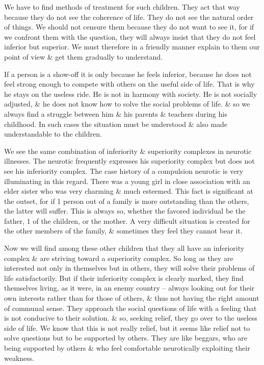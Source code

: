 \documentclass{article}
\begin{document}
We have to find methods of treatment for such children. They act that way because they do not see the coherence of life. They do not see the natural order of things. We should not censure them because they do not want to see it, for if we confront them with the question, they will always insist that they do not feel inferior but superior. We must therefore in a friendly manner explain to them our point of view \& get them gradually to understand.

If a person is a show-off it is only because he feels inferior, because he does not feel strong enough to compete with others on the useful side of life. That is why he stays on the useless ride. He is not in harmony with society. He is not socially adjusted, \& he does not know how to solve the social problems of life. \& so we always find a struggle between him \& his parents \& teachers during his childhood. In such cases the situation must be understood \& also made understandable to the children.

We see the same combination of inferiority \& superiority complexes in neurotic illnesses. The neurotic frequently expresses his superiority complex but does not see his inferiority complex. The case history of a compulsion neurotic is very illuminating in this regard. There was a young girl in close association with an elder sister who was very charming \& much esteemed. This fact is significant at the outset, for if 1 person out of a family is more outstanding than the others, the latter will suffer. This is always so, whether the favored individual be the father, 1 of the children, or the mother. A very difficult situation is created for the other members of the family, \& sometimes they feel they cannot bear it.

Now we will find among these other children that they all have an inferiority complex \& are striving toward a superiority complex. So long as they are interested not only in themselves but in others, they will solve their problems of life satisfactorily. But if their inferiority complex is clearly marked, they find themselves living, as it were, in an enemy country -- always looking out for their own interests rather than for those of others, \& thus not having the right amount of communal sense. They approach the social questions of life with a feeling that is not conducive to their solution. \& so, seeking relief, they go over to the useless side of life. We know that  this is not really relief, but it seems like relief not to solve questions but to be supported by others. They are like beggars, who are being supported by others \& who feel comfortable neurotically exploiting their weakness.
\end{document}
